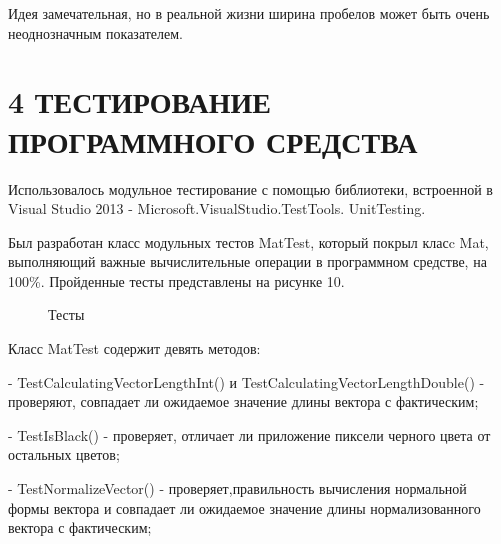 \documentclass[14pt,a4paper]{extreport}
\begin{document}
\hspace {4ex} Идея замечательная, но в реальной жизни ширина пробелов может быть очень неоднозначным показателем.

	\newpage
           \section*{\normalsize\hspace{4ex}4 ТЕСТИРОВАНИЕ ПРОГРАММНОГО СРЕДСТВА}
\hspace {4ex} Использовалось модульное тестирование с помощью библиотеки, встроенной в Visual Studio 2013 - Microsoft.VisualStudio.TestTools. UnitTesting.\ 

\hspace {4ex} Был разработан класс модульных тестов MatTest, который покрыл класc Mat, выполняющий важные вычислительные операции в программном средстве, на 100\%. Пройденные тесты представлены на рисунке 10.\

\begin{figure}[h!]
\caption{Тесты}
\end{figure}

\hspace {4ex} Класс MatTest содержит девять методов:\

\hspace {4ex} - TestCalculatingVectorLengthInt() и TestCalculatingVectorLengthDouble() - проверяют, совпадает ли ожидаемое значение длины вектора с фактическим;\
 
\hspace {4ex} - TestIsBlack() - проверяет, отличает ли приложение пиксели  черного цвета от остальных цветов;\
 
\hspace {4ex} - TestNormalizeVector() - проверяет,правильность вычисления нормальной формы вектора и совпадает ли ожидаемое значение длины нормализованного вектора с фактическим;\
 
\end{document}
